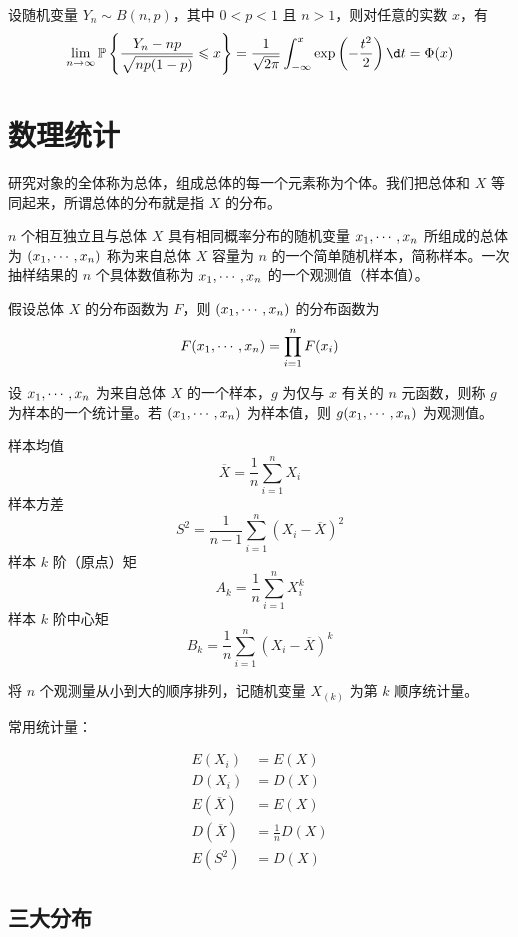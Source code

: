 \begin{theorem}
	设随机变量 $Y_n \sim B(n, p)$，其中 $0 < p < 1$ 且 $n > 1$，则对任意的实数 $x$，有
	\[ \lim_{n \to \infty} \bbP\left\{ \frac{Y_n - np}{\sqrt{np(1 - p)}} \leqslant x \right\} = \frac{1}{\sqrt{2 \pi}} \int_{-\infty}^x \exp\left(-\frac{t^2}{2}\right) \d t = \Phi(x)  \]
\end{theorem}

\section{数理统计}

研究对象的全体称为总体，组成总体的每一个元素称为个体。我们把总体和 $X$ 等同起来，所谓总体的分布就是指 $X$ 的分布。

$n$ 个相互独立且与总体 $X$ 具有相同概率分布的随机变量 $x_1,\cdots,x_n$ 所组成的总体为 $(x_1,\cdots,x_n)$ 称为来自总体 $X$ 容量为 $n$ 的一个简单随机样本，简称样本。一次抽样结果的 $n$ 个具体数值称为 $x_1,\cdots,x_n$ 的一个观测值（样本值）。

假设总体 $X$ 的分布函数为 $F$，则 $(x_1,\cdots,x_n)$ 的分布函数为
\[ F(x_1,\cdots,x_n) = \prod_{i=1}^n F(x_i) \]

设 $x_1,\cdots,x_n$ 为来自总体 $X$ 的一个样本，$g$ 为仅与 $x$ 有关的 $n$ 元函数，则称 $g$ 为样本的一个统计量。若 $(x_1,\cdots,x_n)$ 为样本值，则 $g(x_1,\cdots,x_n)$ 为观测值。

样本均值
\[ \overline{X} = \frac{1}{n} \sum_{i=1}^n X_i \]
样本方差
\[ S^2 = \frac{1}{n-1} \sum_{i=1}^n (X_i - \overline{X})^2 \]
样本 $k$ 阶（原点）矩
\[ A_k = \frac{1}{n} \sum_{i=1}^n X_i^k \]
样本 $k$ 阶中心矩
\[ B_k = \frac{1}{n} \sum_{i=1}^n (X_i - \overline{X})^k \]

将 $n$ 个观测量从小到大的顺序排列，记随机变量 $X_{(k)}$ 为第 $k$ 顺序统计量。

常用统计量：

\[
	\begin{aligned}
		E(X_i)          & = E(X)             \\
		D(X_i)          & = D(X)             \\
		E(\overline{X}) & = E(X)             \\
		D(\overline{X}) & = \frac{1}{n} D(X) \\
		E(S^2)          & = D(X)
	\end{aligned}
\]

\subsection{三大分布}

